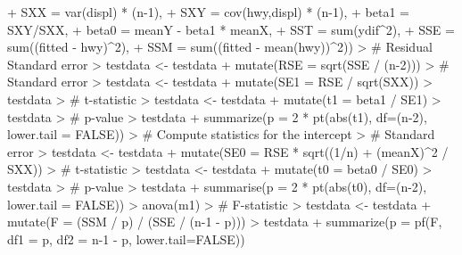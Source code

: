 \documentclass[10pt]{article}
\begin{document}
\begin{Schunk}
\begin{Sinput}
+             SXX = var(displ) * (n-1),
+             SXY = cov(hwy,displ) * (n-1),
+             beta1 = SXY/SXX,
+             beta0 = meanY - beta1 * meanX,
+             SST = sum(ydif^2),
+             SSE = sum((fitted - hwy)^2),
+             SSM = sum((fitted - mean(hwy))^2))
> # Residual Standard error
> testdata <- testdata %
+   mutate(RSE = sqrt(SSE / (n-2)))
> # Standard error 
> testdata <- testdata %
+   mutate(SE1 = RSE / sqrt(SXX))
> testdata %
> # t-statistic
> testdata <- testdata %
+   mutate(t1 = beta1 / SE1)
> testdata %
> # p-value
> testdata %
+   summarize(p = 2 * pt(abs(t1), df=(n-2), lower.tail = FALSE))
> # Compute statistics for the intercept
> # Standard error 
> testdata <- testdata %
+   mutate(SE0 = RSE * sqrt((1/n) + (meanX)^2 / SXX))
> # t-statistic
> testdata <- testdata %
+   mutate(t0 = beta0 / SE0)
> testdata %
> # p-value
> testdata %
+   summarise(p = 2 * pt(abs(t0), df=(n-2), lower.tail = FALSE))
> anova(m1)
> # F-statistic
> testdata <- testdata %
+   mutate(F = (SSM / p) / (SSE / (n-1 - p)))
> testdata %
+   summarize(p = pf(F, df1 = p, df2 = n-1 - p, lower.tail=FALSE))
\end{Sinput}
\end{Schunk}
\end{document}
